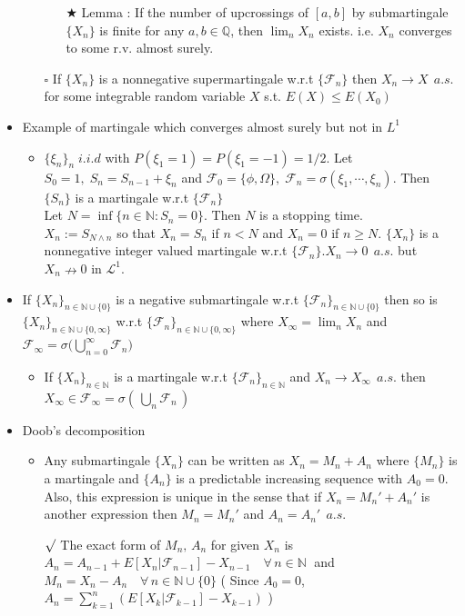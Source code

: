 \documentclass[12pt, A4]{article}
\newcommand{\sq}{$\square$}
\newcommand{\rmk}{$\surd$}
\newcommand{\trick}{$\bigstar$}
\newcommand{\N}{\mathbb{N}}
\newcommand{\Q}{\mathbb{Q}}
\newcommand{\F}{\mathcal{F}}
\newcommand{\LL}{\mathcal{L}}
\newcommand{\foranyn}{\quad \forall \, n\in \N}
\begin{document}
\begin{itemize}
\begin{itemize}
\begin{itemize}
			\item[\trick] Lemma : If the number of upcrossings of $[a,b]$ by submartingale $\{X_n\}$ is finite for any $a,b\in \Q$, then $\lim_n X_n$ exists.\; i.e. $X_n$ converges to some r.v. almost surely.
		\end{itemize}
		\item[\sq] If $\{X_n\}$ is a nonnegative supermartingale w.r.t $\{\F_n\}$ then $X_n\rightarrow X\;\, a.s.$ for some integrable random variable $X$ s.t. $E(X)\leq E(X_0)$
	\end{itemize} 
	\item Example of martingale which converges almost surely but not in $L^1$
	\begin{itemize}
		\item $\{\xi_n\}_n\;i.i.d$ with $P(\xi_1=1)=P(\xi_1=-1)=1/2$. Let $S_0=1,\; S_n=S_{n-1}+\xi_n$ and $\F_0=\{\phi, \Omega\}, \; \F_n=\sigma(\xi_1, \cdots, \xi_n)$. Then $\{S_n\}$ is a martingale w.r.t $\{\F_n\}$ \\ Let $N=\inf\{n\in \N : S_n=0\}$. Then $N$ is a stopping time. \\ $X_n:=S_{N\wedge n}$ so that $X_n=S_n$ if $n<N$ and $X_n=0$ if $n\geq N$. $\{X_n\}$ is a nonnegative integer valued martingale w.r.t $\{\F_n\}$.\quad $X_n\rightarrow 0\;\, a.s.$ but $X_n \nrightarrow 0$ in $\LL^1$.
	\end{itemize}
	\item If $\{X_n\}_{n\in \N\cup\{0\}}$ is a negative submartingale w.r.t $\{\F_n\}_{n\in \N\cup\{0\}}$ then so is $\{X_n\}_{n\in \N\cup\{0,\infty\}}$ w.r.t $\{\F_n\}_{n\in \N\cup\{0,\infty\}}$ where $X_\infty=\lim_n X_n$ and $\F_\infty= \sigma\big(\bigcup_{n=0}^\infty \F_n \big)$
	\begin{itemize}
		\item If $\{X_n\}_{n\in \N}$ is a martingale w.r.t $\{\F_n\}_{n\in \N}$ and $X_n\rightarrow X_\infty\;\,a.s.$ then $X_\infty\in \F_\infty=\sigma(\, \bigcup_n \F_n\,)$
	\end{itemize}
	\item Doob's decomposition
	\begin{itemize}
		\item Any submartingale $\{X_n\}$ can be written as $X_n=M_n+A_n$ where $\{M_n\}$ is a martingale and $\{A_n\}$ is a predictable increasing sequence with $A_0=0$. Also, this expression is unique in the sense that if $X_n=M_n'+A_n'$ is another expression then $M_n=M_n'$ and $A_n=A_n'\;\,a.s.$
		\item[\rmk] The exact form of $M_n,\, A_n$ for given $X_n$ is $A_n=A_{n-1}+E[X_n|\F_{n-1}]-X_{n-1}\foranyn\;$ and $M_n=X_n-A_n \foranyn\cup\{0\}$ ( Since $A_0=0$, $A_n=\sum_{k=1}^n (E[X_k|\F_{k-1}]-X_{k-1})$ )

\end{itemize}
\end{itemize}
\end{document}
